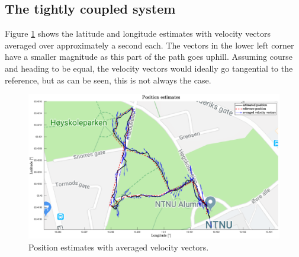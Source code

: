     \subsection{The tightly coupled system}
    \label{sec:res:tightly-coupled}
    Figure \ref{fig:test-gnss-vel} shows the latitude and longitude estimates with velocity vectors averaged over approximately a second each. The vectors in the lower left corner have a smaller magnitude as this part of the path goes uphill. Assuming course and heading to be equal, the velocity vectors would ideally go tangential to the reference, but as can be seen, this is not always the case.\\
     
    
    \begin{figure}[!htbp]
        \hspace{-1.5cm}
        \includegraphics[scale=0.3]{Results/Images/position-with-vel.eps}
        \caption{Position estimates with averaged velocity vectors.}
        \label{fig:test-gnss-vel}
    \end{figure}
    
